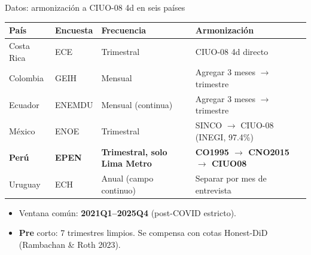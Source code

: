 \documentclass[aspectratio=169,11pt]{beamer}
\newcommand{\cit}[1]{\textcolor{pgray}{\small(#1)}}
\begin{document}
\begin{frame}{Datos: armonización a CIUO-08 4d en seis países}
\footnotesize
\vspace{0.2em}
\begin{tabularx}{\linewidth}{@{}llXX@{}}
\toprule
\textbf{País} & \textbf{Encuesta} & \textbf{Frecuencia} & \textbf{Armonización}\\
\midrule
Costa Rica & ECE     & Trimestral             & CIUO-08 4d directo \\
Colombia   & GEIH    & Mensual                & Agregar 3 meses $\to$ trimestre \\
Ecuador    & ENEMDU  & Mensual (continua)     & Agregar 3 meses $\to$ trimestre \\
México   & ENOE    & Trimestral             & SINCO $\to$ CIUO-08 (INEGI, 97.4\%) \\
\textbf{Perú} & \textbf{EPEN} & \textbf{Trimestral, solo Lima Metro} & \textbf{CO1995 $\to$ CNO2015 $\to$ CIUO08} \\
Uruguay    & ECH     & Anual (campo continuo) & Separar por mes de entrevista \\
\bottomrule
\end{tabularx}

\vspace{0.6em}
\normalsize
\begin{itemize}
  \item Ventana común: \textbf{2021Q1--2025Q4} (post-COVID estricto).
  \item \textbf{Pre} corto: 7 trimestres limpios. Se compensa con cotas Honest-DiD \cit{Rambachan \& Roth 2023}.
\end{itemize}
\end{frame}
\end{document}
